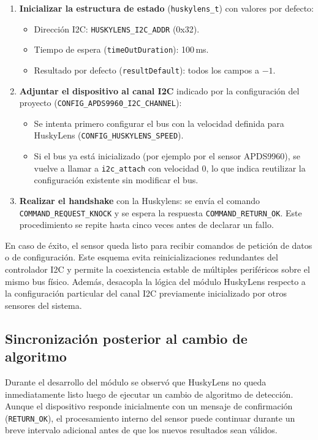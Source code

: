 \documentclass{prgrado}
\begin{document}
\begin{enumerate}[noitemsep]
  \item \textbf{Inicializar la estructura de estado} (\texttt{huskylens\_t}) con valores por defecto:
  \begin{itemize}[noitemsep]
    \item Dirección I2C: \texttt{HUSKYLENS\_I2C\_ADDR} (0x32).
    \item Tiempo de espera (\texttt{timeOutDuration}): 100\,ms.
    \item Resultado por defecto (\texttt{resultDefault}): todos los campos a $-1$.
  \end{itemize}
  \item \textbf{Adjuntar el dispositivo al canal I2C} indicado por la configuración del proyecto (\texttt{CONFIG\_APDS9960\_I2C\_CHANNEL}):
  \begin{itemize}[noitemsep]
    \item Se intenta primero configurar el bus con la velocidad definida para HuskyLens (\texttt{CONFIG\_HUSKYLENS\_SPEED}).
    \item Si el bus ya está inicializado (por ejemplo por el sensor APDS9960), se vuelve a llamar a \texttt{i2c\_attach} con velocidad 0, lo que indica reutilizar la configuración existente sin modificar el bus.
  \end{itemize}
  \item \textbf{Realizar el handshake} con la Huskylens: se envía el comando \texttt{COMMAND\_REQUEST\_KNOCK} y se espera la respuesta \texttt{COMMAND\_RETURN\_OK}. Este procedimiento se repite hasta cinco veces antes de declarar un fallo.
\end{enumerate}

En caso de éxito, el sensor queda listo para recibir comandos de petición de datos o de configuración.
Este esquema evita reinicializaciones redundantes del controlador I2C y permite
la coexistencia estable de múltiples periféricos sobre el mismo bus físico.
Además, desacopla la lógica del módulo HuskyLens respecto a la configuración
particular del canal I2C previamente inicializado por otros sensores del sistema.

\subsection{Sincronización posterior al cambio de algoritmo}

Durante el desarrollo del módulo se observó que HuskyLens no queda
inmediatamente listo luego de ejecutar un cambio de algoritmo de detección.
Aunque el dispositivo responde inicialmente con un mensaje de confirmación
(\texttt{RETURN\_OK}), el procesamiento interno del sensor puede continuar
durante un breve intervalo adicional antes de que los nuevos resultados sean
válidos.
\end{document}
